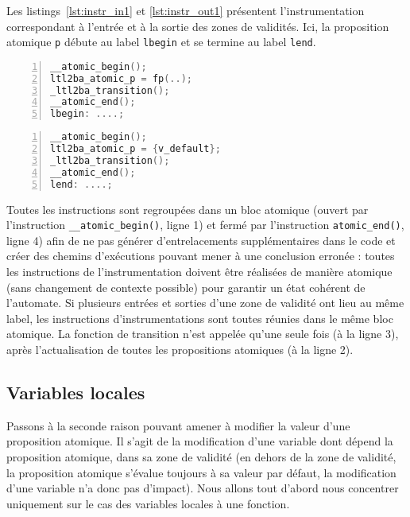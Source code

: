 Les listings~\ref{lst:instr_in1} et \ref{lst:instr_out1} présentent
l'instrumentation correspondant à l'entrée et à la sortie des zones de
validités. Ici, la proposition atomique \texttt{p} débute au label
\texttt{lbegin} et se termine au label \texttt{lend}.

\noindent\begin{minipage}{.47\textwidth}
  \begin{lstlisting}[language=C, frame=single, numbers=left,
    caption=Entrée d'une zone de validité (1),
    label=lst:instr_in1]
__atomic_begin();
ltl2ba_atomic_p = fp(..);
_ltl2ba_transition();
__atomic_end();
lbegin: ....;
\end{lstlisting}
\end{minipage}\hfill
\begin{minipage}{.47\textwidth}
  \begin{lstlisting}[language=C, frame=single, numbers=left,
    caption=Sortie d'une zone de validité (1),
    label=lst:instr_out1]
__atomic_begin();
ltl2ba_atomic_p = {v_default};
_ltl2ba_transition();
__atomic_end();
lend: ....;
\end{lstlisting}
\end{minipage}

Toutes les instructions sont regroupées dans un bloc atomique (ouvert
par l'instruction \texttt{\_\_atomic\_begin()}, ligne 1) et fermé par
l'instruction \texttt{atomic\_end()}, ligne 4) afin de ne pas générer
d'entrelacements supplémentaires dans le code et créer des chemins
d'exécutions pouvant mener à une conclusion erronée : toutes les
instructions de l'instrumentation doivent être réalisées de manière
atomique (sans changement de contexte possible) pour garantir un état
cohérent de l'automate. Si plusieurs entrées et sorties d'une zone de validité ont
lieu au même label, les instructions d'instrumentations sont toutes
réunies dans le même bloc atomique. La fonction de transition n'est
appelée qu'une seule fois (à la ligne 3), après l'actualisation de toutes les
propositions atomiques (à la ligne 2).

\subsection{Variables locales}

Passons à la seconde raison pouvant amener à modifier la valeur d'une
proposition atomique. Il s'agit de la modification d'une variable dont
dépend la proposition atomique, dans sa zone de validité (en dehors de
la zone de validité, la proposition atomique s'évalue toujours à sa
valeur par défaut, la modification d'une variable n'a donc pas
d'impact). Nous allons tout d'abord nous concentrer uniquement sur le
cas des variables locales à une fonction.

